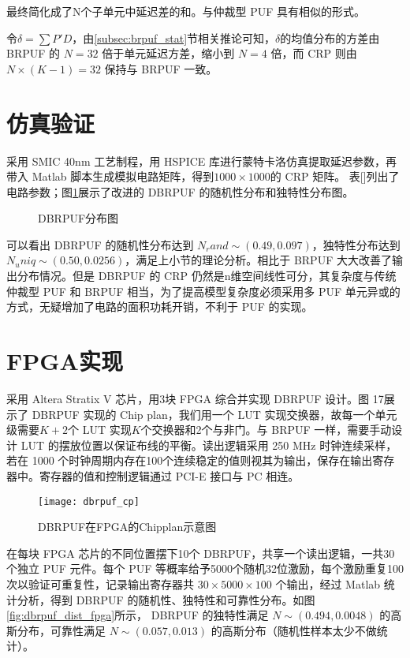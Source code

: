 最终简化成了N个子单元中延迟差的和。与仲裁型 PUF 具有相似的形式。

令$ \delta=\sum P'D $，由\ref{subsec:brpuf_stat}节相关推论可知，$ \delta $的均值分布的方差由 BRPUF 的 $ N=32 $ 倍于单元延迟方差，缩小到 $ N=4 $ 倍，而 CRP 则由 $ N\times (K-1)=32 $ 保持与 BRPUF 一致。

\section{仿真验证}
采用 SMIC 40nm 工艺制程，用 HSPICE 库进行蒙特卡洛仿真提取延迟参数，再带入 Matlab 脚本生成模拟电路矩阵，得到$ 1000\times 1000 $的 CRP 矩阵。
表[]列出了电路参数；图\ref{fig:dbrpuf_dist}展示了改进的 DBRPUF 的随机性分布和独特性分布图。

\begin{figure}[htb!]
\centering
{}
\caption{DBRPUF分布图}
\label{fig:dbrpuf_dist}
\end{figure}

可以看出 DBRPUF 的随机性分布达到 $ N_rand\sim(0.49,0.097) $，独特性分布达到 $ N_uniq\sim(0.50,0.0256) $，满足上小节的理论分析。相比于 BRPUF 大大改善了输出分布情况。但是 DBRPUF 的 CRP 仍然是n维空间线性可分，其复杂度与传统仲裁型 PUF 和 BRPUF 相当，为了提高模型复杂度必须采用多 PUF 单元异或的方式，无疑增加了电路的面积功耗开销，不利于 PUF 的实现。


\section{FPGA实现}
采用 Altera Stratix V 芯片，用3块 FPGA 综合并实现 DBRPUF 设计。图 17展示了 DBRPUF 实现的 Chip plan，我们用一个 LUT 实现交换器，故每一个单元级需要$ K+2 $个 LUT 实现$ K $个交换器和2个与非门。与 BRPUF 一样，需要手动设计 LUT 的摆放位置以保证布线的平衡。读出逻辑采用 250 MHz 时钟连续采样，若在 1000 个时钟周期内存在100个连续稳定的值则视其为输出，保存在输出寄存器中。寄存器的值和控制逻辑通过 PCI-E 接口与 PC 相连。

\begin{figure}[htb]
\centering
\texttt{[image: dbrpuf\_cp]}
\caption{DBRPUF在FPGA的Chipplan示意图}
\label{fig:dbrpuf_chipplan}
\end{figure}

在每块 FPGA 芯片的不同位置摆下10个 DBRPUF，共享一个读出逻辑，一共30个独立 PUF 元件。每个 PUF 等概率给予5000个随机32位激励，每个激励重复100次以验证可重复性，记录输出寄存器共 $ 30\times 5000\times 100 $ 个输出，经过 Matlab 统计分析，得到 DBRPUF 的随机性、独特性和可靠性分布。如图\ref{fig:dbrpuf_dist_fpga}所示， DBRPUF 的独特性满足 $ N\sim(0.494,0.0048) $ 的高斯分布，可靠性满足 $ N\sim(0.057,0.013) $ 的高斯分布（随机性样本太少不做统计）。

